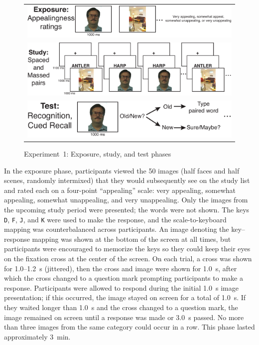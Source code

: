 
\begin{figure}
  \centering
  \begin{tabular}{l}
  \includegraphics[width=.8\textwidth]{./figs/exp1/space_example_expo} \\
  \includegraphics[width=.9\textwidth]{./figs/exp1/space_example_study_fix} \\
  \includegraphics[width=.7\textwidth]{./figs/exp1/space_example_test}
  \end{tabular}
  \caption{Experiment~1: Exposure, study, and test phases}
  \label{fig:space_exp}
\end{figure}

In the exposure phase, participants viewed the 50 images (half faces and half scenes, randomly intermixed) that they would subsequently see on the study list and rated each on a four-point ``appealing'' scale: very appealing, somewhat appealing, somewhat unappealing, and very unappealing.  Only the images from the upcoming study period were presented; the words were not shown.  The keys {\tt D}, {\tt F}, {\tt J}, and {\tt K} were used to make the response, and the scale-to-keyboard mapping was counterbalanced across participants.  An image denoting the key--response mapping was shown at the bottom of the screen at all times, but participants were encouraged to memorize the keys so they could keep their eyes on the fixation cross at the center of the screen.  On each trial, a cross was shown for 1.0--1.2~s (jittered), then the cross and image were shown for 1.0~s, after which the cross changed to a question mark prompting participants to make a response.  Participants were allowed to respond during the initial 1.0~s image presentation; if this occurred, the image stayed on screen for a total of 1.0~s.  If they waited longer than 1.0~s and the cross changed to a question mark, the image remained on screen until a response was made or 3.0~s passed.  No more than three images from the same category could occur in a row. This phase lasted approximately 3~min.


